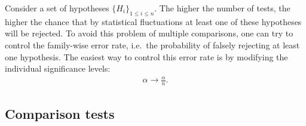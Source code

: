     \begin{construct}
        Consider a set of hypotheses $\{H_i\}_{1\leq i\leq n}$. The higher the number of tests, the higher the chance that by statistical fluctuations at least one of these hypotheses will be rejected. To avoid this problem of multiple comparisons, one can try to control the family-wise error rate, i.e.~the probability of falsely rejecting at least one hypothesis. The easiest way to control this error rate is by modifying the individual significance levels:
        \begin{gather}
            \alpha\longrightarrow\frac{\alpha}{n}.
        \end{gather}
    \end{construct}

\subsection{Comparison tests}

